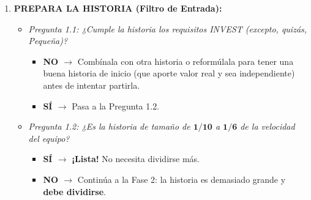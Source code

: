 \begin{enumerate}[label=\textbf{Fase \arabic*:}, leftmargin=1.9cm, itemsep=5pt]
    \item \textbf{PREPARA LA HISTORIA (Filtro de Entrada):}
    \begin{itemize}[itemsep=2pt]
        \item \textit{Pregunta 1.1: ¿Cumple la historia los requisitos INVEST (excepto, quizás, Pequeña)?}
        \begin{itemize}
            \item \textbf{NO $\longrightarrow$} Combínala con otra historia o reformúlala para tener una buena historia de inicio (que aporte valor real y sea independiente) antes de intentar partirla.
            \item \textbf{SÍ $\longrightarrow$} Pasa a la Pregunta 1.2.
        \end{itemize}
        \item \textit{Pregunta 1.2: ¿Es la historia de tamaño de $\mathbf{1/10}$ a $\mathbf{1/6}$ de la velocidad del equipo?}
        \begin{itemize}
            \item \textbf{SÍ $\longrightarrow$} \textbf{¡Lista!} No necesita dividirse más.
            \item \textbf{NO $\longrightarrow$} Continúa a la Fase 2: la historia es demasiado grande y \textbf{debe dividirse}.
        \end{itemize}
    \end{itemize}


\end{enumerate}
